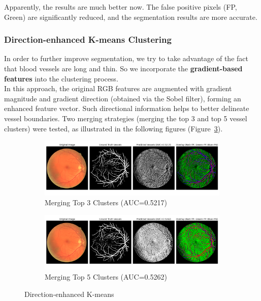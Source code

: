 \documentclass[12pt,letterpaper]{article}
\begin{document}
\noindent
Apparently, the results are much better now. The false positive pixels (FP, Green) are significantly reduced, and the segmentation results are more accurate. 
\subsubsection{Direction-enhanced K-means Clustering}
In order to further improve segmentation, we try to take advantage of the fact that blood vessels are long and thin. So we incorporate the \textbf{gradient-based features} into the clustering process. \\
In this approach, the original RGB features are augmented with gradient magnitude and gradient direction (obtained via the Sobel filter), forming an enhanced feature vector. Such directional information helps to better delineate vessel boundaries. Two merging strategies (merging the top 3 and top 5 vessel clusters) were tested, as illustrated in the following figures (Figure~\ref{fig:de}).
\begin{figure}[H]
    \centering
    \begin{subfigure}[H]{\textwidth}
        \centering
        \includegraphics[scale=0.35]{Figures/5 Directed (Merge 3 Clusters).png}
        \vspace{-0.5cm}
        \caption{Merging Top 3 Clusters (AUC=0.5217)}
        \label{fig:de3}
    \end{subfigure}
    \begin{subfigure}[H]{\textwidth}
        \centering
        \includegraphics[scale=0.35]{Figures/5 Directed (Merge 5 Clusters).png}
        \vspace{-0.5cm}
        \caption{Merging Top 5 Clusters (AUC=0.5262)}
        \label{fig:de5}
    \end{subfigure}
    \caption{Direction-enhanced K-means}
    \label{fig:de}
\end{figure}
\end{document}
